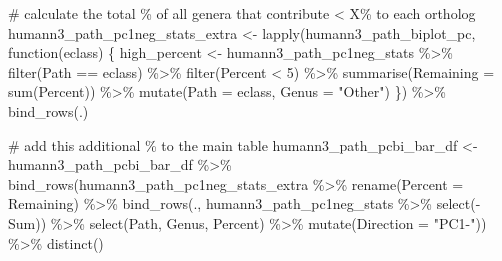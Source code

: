 \documentclass[
  letterpaper,
]{book}
\newenvironment{Shaded}{}{}
\newcommand{\AttributeTok}[1]{\textcolor[rgb]{0.84,0.23,0.29}{#1}}
\newcommand{\CommentTok}[1]{\textcolor[rgb]{0.42,0.45,0.49}{#1}}
\newcommand{\ControlFlowTok}[1]{\textcolor[rgb]{0.84,0.23,0.29}{#1}}
\newcommand{\DecValTok}[1]{\textcolor[rgb]{0.00,0.36,0.77}{#1}}
\newcommand{\FunctionTok}[1]{\textcolor[rgb]{0.44,0.26,0.76}{#1}}
\newcommand{\NormalTok}[1]{\textcolor[rgb]{0.14,0.16,0.18}{#1}}
\newcommand{\OtherTok}[1]{\textcolor[rgb]{0.44,0.26,0.76}{#1}}
\newcommand{\SpecialCharTok}[1]{\textcolor[rgb]{0.00,0.36,0.77}{#1}}
\newcommand{\StringTok}[1]{\textcolor[rgb]{0.01,0.18,0.38}{#1}}
\begin{document}
\begin{Shaded}
\begin{Highlighting}[]
\CommentTok{\# calculate the total \% of all genera that contribute \textless{} X\% to each ortholog}
\NormalTok{humann3\_path\_pc1neg\_stats\_extra }\OtherTok{\textless{}{-}} \FunctionTok{lapply}\NormalTok{(humann3\_path\_biplot\_pc, }\ControlFlowTok{function}\NormalTok{(eclass) \{}
\NormalTok{ high\_percent }\OtherTok{\textless{}{-}}\NormalTok{ humann3\_path\_pc1neg\_stats }\SpecialCharTok{\%\textgreater{}\%}
   \FunctionTok{filter}\NormalTok{(Path }\SpecialCharTok{==}\NormalTok{ eclass) }\SpecialCharTok{\%\textgreater{}\%}
   \FunctionTok{filter}\NormalTok{(Percent }\SpecialCharTok{\textless{}} \DecValTok{5}\NormalTok{) }\SpecialCharTok{\%\textgreater{}\%}
   \FunctionTok{summarise}\NormalTok{(}\AttributeTok{Remaining =} \FunctionTok{sum}\NormalTok{(Percent)) }\SpecialCharTok{\%\textgreater{}\%}
   \FunctionTok{mutate}\NormalTok{(}\AttributeTok{Path =}\NormalTok{ eclass,}
          \AttributeTok{Genus =} \StringTok{"Other"}\NormalTok{)}
\NormalTok{\}) }\SpecialCharTok{\%\textgreater{}\%}
 \FunctionTok{bind\_rows}\NormalTok{(.)}

\CommentTok{\# add this additional \% to the main table}
\NormalTok{humann3\_path\_pcbi\_bar\_df }\OtherTok{\textless{}{-}}\NormalTok{ humann3\_path\_pcbi\_bar\_df }\SpecialCharTok{\%\textgreater{}\%}
  \FunctionTok{bind\_rows}\NormalTok{(humann3\_path\_pc1neg\_stats\_extra }\SpecialCharTok{\%\textgreater{}\%}
            \FunctionTok{rename}\NormalTok{(}\AttributeTok{Percent =}\NormalTok{ Remaining) }\SpecialCharTok{\%\textgreater{}\%}
            \FunctionTok{bind\_rows}\NormalTok{(., humann3\_path\_pc1neg\_stats }\SpecialCharTok{\%\textgreater{}\%}
                      \FunctionTok{select}\NormalTok{(}\SpecialCharTok{{-}}\NormalTok{Sum)) }\SpecialCharTok{\%\textgreater{}\%}
            \FunctionTok{select}\NormalTok{(Path, Genus, Percent) }\SpecialCharTok{\%\textgreater{}\%}
            \FunctionTok{mutate}\NormalTok{(}\AttributeTok{Direction =} \StringTok{"PC1{-}"}\NormalTok{)) }\SpecialCharTok{\%\textgreater{}\%}
  \FunctionTok{distinct}\NormalTok{()}


\end{Highlighting}
\end{Shaded}
\end{document}
